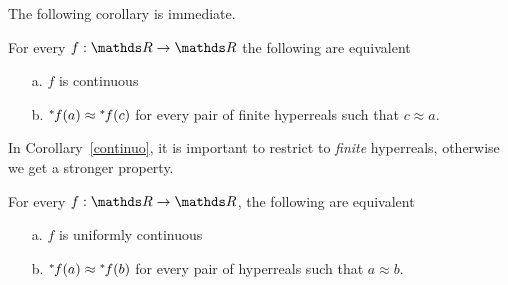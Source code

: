 The following corollary is immediate.

\begin{corollary} \label{continuo} For every $f:\RR\to\RR$ the following are equivalent
\begin{itemize}
\item[a.] $f$ is continuous
\item[b.] ${}^*\kern-.2ex f(a)\approx {}^*\kern-.2ex f(c)$ for every pair of finite hyperreals such that $c\approx a$.
\end{itemize}
\end{corollary}

In Corollary~\ref{continuo}, it is important to restrict  to \textit{finite\/} hyperreals, otherwise we get a stronger property.

\begin{proposition}\label{prop_unif_cont}
   For every $f:\RR\to\RR$, the following are equivalent
  \begin{itemize}
  \item[a.] $f$ is uniformly continuous
  \item[b.] ${}^*\kern-.2ex f(a)\approx{}^*\kern-.2ex  f(b)$ for every pair of hyperreals such that $a\approx b$.
  \end{itemize}
\end{proposition}

